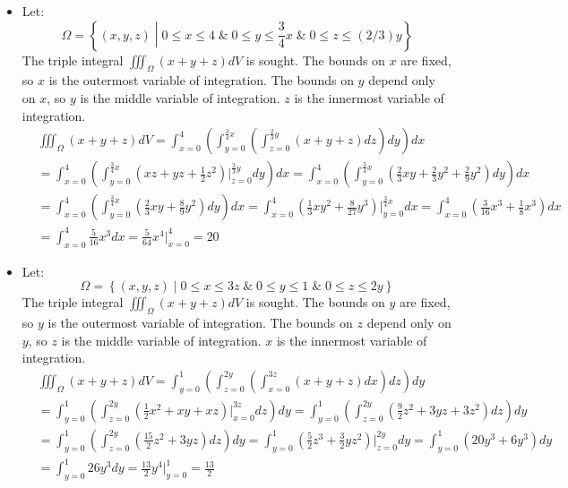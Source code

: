\documentclass{article}
\begin{document}
\begin{itemize}
\item Let:
\[\Omega = \left\{(x,y,z) \middle| 0 \leq x \leq 4 \;\&\; 0 \leq y \leq \frac{3}{4}x \;\&\; 0 \leq z \leq (2/3)y \right\}\]  
The triple integral \(\iiint_{\Omega} (x + y + z)dV\) is sought. The bounds on \(x\) are fixed, so \(x\) is the outermost variable of integration. The bounds on \(y\) depend only on \(x\), so \(y\) is the middle variable of integration. \(z\) is the innermost variable of integration.   
\begin{align*}
& \iiint_{\Omega} (x + y + z)dV 
= \int_{x = 0}^4 \left(\int_{y = 0}^{\frac{3}{4}x} \left(\int_{z = 0}^{\frac{2}{3}y} (x + y + z)dz\right)dy\right)dx \\ 
& = \int_{x = 0}^4 \left(\int_{y = 0}^{\frac{3}{4}x} (xz + yz + \frac{1}{2}z^2)\Big|_{z = 0}^{\frac{2}{3}y}dy\right)dx 
= \int_{x = 0}^4 \left(\int_{y = 0}^{\frac{3}{4}x} (\frac{2}{3}xy + \frac{2}{3}y^2 + \frac{2}{9}y^2)dy\right)dx \\  
& = \int_{x = 0}^4 \left(\int_{y = 0}^{\frac{3}{4}x} (\frac{2}{3}xy + \frac{8}{9}y^2)dy\right)dx  
= \int_{x = 0}^4 (\frac{1}{3}xy^2 + \frac{8}{27}y^3)\Big|_{y = 0}^{\frac{3}{4}x} dx 
= \int_{x = 0}^4 (\frac{3}{16}x^3 + \frac{1}{8}x^3) dx \\
& = \int_{x = 0}^4 \frac{5}{16}x^3 dx 
= \frac{5}{64}x^4\Big|_{x = 0}^4  
= 20
\end{align*}


\item Let:
\[\Omega = \left\{(x,y,z) \middle| 0 \leq x \leq 3z \;\&\; 0 \leq y \leq 1 \;\&\; 0 \leq z \leq 2y \right\}\]  
The triple integral \(\iiint_{\Omega} (x + y + z)dV\) is sought. The bounds on \(y\) are fixed, so \(y\) is the outermost variable of integration. The bounds on \(z\) depend only on \(y\), so \(z\) is the middle variable of integration. \(x\) is the innermost variable of integration.   
\begin{align*}
& \iiint_{\Omega} (x + y + z)dV  
= \int_{y = 0}^1 \left(\int_{z = 0}^{2y} \left(\int_{x = 0}^{3z} (x + y + z)dx\right)dz\right)dy \\ 
& = \int_{y = 0}^1 \left(\int_{z = 0}^{2y} (\frac{1}{2}x^2 + xy + xz)\Big|_{x = 0}^{3z} dz\right)dy    
= \int_{y = 0}^1 \left(\int_{z = 0}^{2y} (\frac{9}{2}z^2 + 3yz + 3z^2) dz\right)dy \\   
& = \int_{y = 0}^1 \left(\int_{z = 0}^{2y} (\frac{15}{2}z^2 + 3yz) dz\right)dy 
= \int_{y = 0}^1 (\frac{5}{2}z^3 + \frac{3}{2}yz^2)\Big|_{z = 0}^{2y} dy  
= \int_{y = 0}^1 (20y^3 + 6y^3) dy \\   
& = \int_{y = 0}^1 26y^3 dy 
= \frac{13}{2}y^4\Big|_{y = 0}^1 
= \frac{13}{2} 
\end{align*}


\end{itemize}
\end{document}
